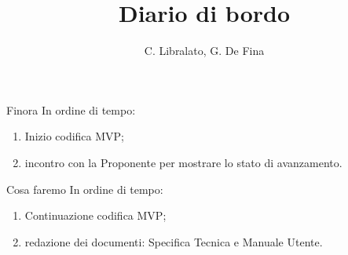 \documentclass{beamer}
\title{Diario di bordo}
\author[C. Libralato, G. De Fina]{C. Libralato, G. De Fina}
\begin{document}
{
\begin{frame}
    \titlepage
\end{frame}
}

\begin{frame}{Finora}
    In ordine di tempo:
    \begin{enumerate}
        \setlength{\itemsep}{0.9em}
        \item Inizio codifica MVP;
        \item incontro con la Proponente per mostrare lo stato di avanzamento. 
    \end{enumerate}
\end{frame}

\begin{frame}{Cosa faremo}
    In ordine di tempo:
    \begin{enumerate}
        \setlength{\itemsep}{1.2em}
        \item Continuazione codifica MVP;
        \item redazione dei documenti: Specifica Tecnica e Manuale Utente.
    \end{enumerate}
\end{frame}


\end{document}
